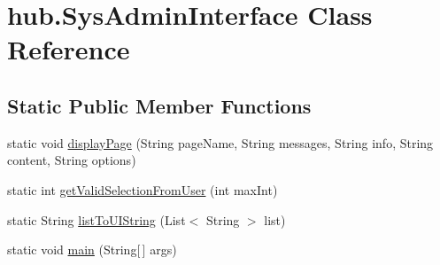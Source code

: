 \hypertarget{classhub_1_1_sys_admin_interface}{
\section{hub.\-Sys\-Admin\-Interface \-Class \-Reference}
\label{classhub_1_1_sys_admin_interface}
}
\subsection*{\-Static \-Public \-Member \-Functions}
\begin{DoxyCompactItemize}
\item 
static void \hyperlink{classhub_1_1_sys_admin_interface_aa5e3962f03960554dc9fd43fe026c4ca}{display\-Page} (\-String page\-Name, \-String messages, \-String info, \-String content, \-String options)
\item 
static int \hyperlink{classhub_1_1_sys_admin_interface_abebd4cf73ab86353de9ba5bb495d2f2b}{get\-Valid\-Selection\-From\-User} (int max\-Int)
\item 
static \-String \hyperlink{classhub_1_1_sys_admin_interface_ac60f8b0cd7ef1574000c8a25658ae1e6}{list\-To\-U\-I\-String} (\-List$<$ \-String $>$ list)
\item 
static void \hyperlink{classhub_1_1_sys_admin_interface_a9e0d12a41d4879a5e83778730f1643f5}{main} (\-String\mbox{[}$\,$\mbox{]} args)
\end{DoxyCompactItemize}
